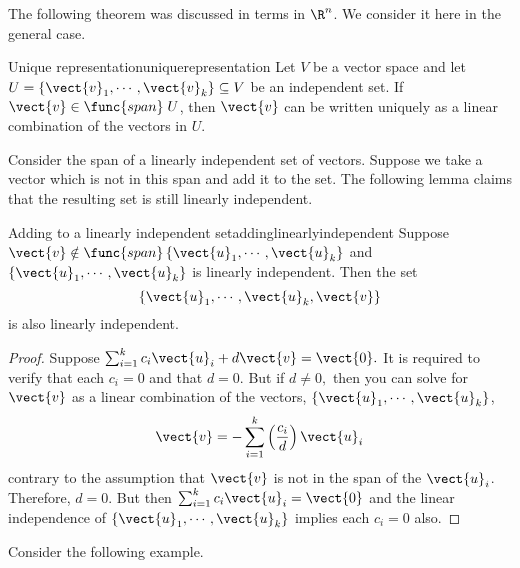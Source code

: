 The following theorem was discussed in terms in $\R^n$. We consider it here in the general case.

\begin{theorem}{Unique representation}{uniquerepresentation}
Let $V$ be a vector space and let $U = \left\{ \vect{v}_1, \cdots, \vect{v}_k \right\} \subseteq V$ be an independent set. If $\vect{v} \in \func{span} \;U$, then $\vect{v}$ can be written uniquely as a linear combination of the vectors in $U$. 
\end{theorem}

Consider the span of a linearly independent set of vectors. Suppose we take a vector which is not in this span and add it to the set. The following lemma claims that the resulting set is still linearly independent. 

\begin{lemma}{Adding to a linearly independent set}{addinglinearlyindependent}
Suppose $\vect{v}\notin \func{span}\left\{ \vect{u}_{1},\cdots ,\vect{u}_{k}\right\} $ and $\left\{ \vect{u}_{1},\cdots ,
\vect{u}_{k}\right\} $ is linearly independent. Then the set
\begin{equation*}
\left\{ \vect{u}_{1},\cdots ,\vect{u}_{k},\vect{v} \right\}
\end{equation*}
is also linearly independent.
\end{lemma}

\begin{proof}
Suppose $\sum_{i=1}^{k}c_{i}\vect{u}_{i}+d\vect{v}=
\vect{0}.$ It is required to verify that each $c_{i}=0$ and that $d=0.$
But if $d\neq 0,$ then you can solve for $\vect{v}$ as a linear
combination of the vectors, $\left\{ \vect{u}_{1},\cdots ,\vect{u}
_{k}\right\} $, 
\begin{equation*}
\vect{v}=-\sum_{i=1}^{k}\left( \frac{c_{i}}{d}\right) \vect{u}_{i}
\end{equation*}
contrary to the assumption that $\vect{v}$ is not in the span of the $\vect{u}_{i}$. Therefore, $d=0.$ But then $\sum_{i=1}^{k}c_{i}
\vect{u}_{i}=\vect{0}$ and the linear independence of $\left\{ \vect{u}
_{1},\cdots ,\vect{u}_{k}\right\} $ implies each $c_{i}=0$ also. 
\end{proof}

Consider the following example.

